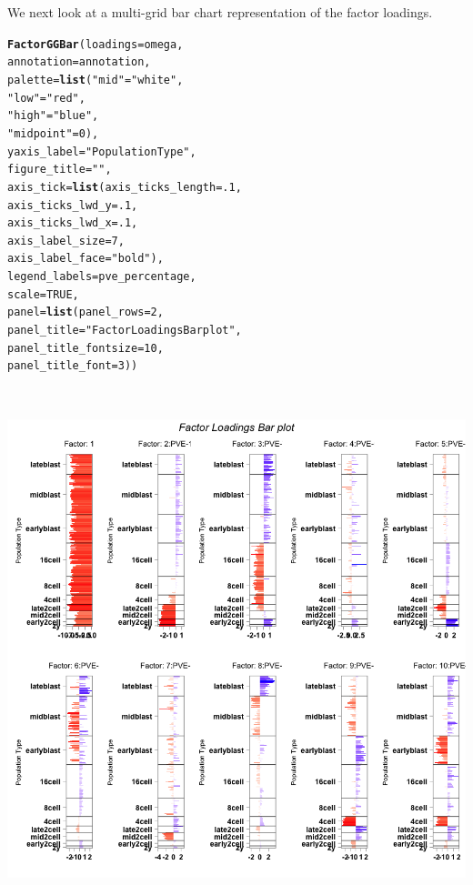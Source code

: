 \documentclass[12pt]{article}\usepackage[]{graphicx}\usepackage[usenames,dvipsnames]{color}
\makeatletter
\newcommand{\hlnum}[1]{\textcolor[rgb]{0.686,0.059,0.569}{#1}}%
\newcommand{\hlstr}[1]{\textcolor[rgb]{0.192,0.494,0.8}{#1}}%
\newcommand{\hlstd}[1]{\textcolor[rgb]{0.345,0.345,0.345}{#1}}%
\newcommand{\hlkwc}[1]{\textcolor[rgb]{0.333,0.667,0.333}{#1}}%
\newcommand{\hlkwd}[1]{\textcolor[rgb]{0.737,0.353,0.396}{\textbf{#1}}}%
\newenvironment{kframe}{%
 \def\at@end@of@kframe{}%
 \ifinner\ifhmode%
  \def\at@end@of@kframe{\end{minipage}}%
  \begin{minipage}{\columnwidth}%
 \fi\fi%
 \def\FrameCommand##1{\hskip\@totalleftmargin \hskip-\fboxsep
 \colorbox{shadecolor}{##1}\hskip-\fboxsep
     \hskip-\linewidth \hskip-\@totalleftmargin \hskip\columnwidth}%
 \MakeFramed {\advance\hsize-\width
   \@totalleftmargin\z@ \linewidth\hsize
   \@setminipage}}%
 {\par\unskip\endMakeFramed%
 \at@end@of@kframe}
\newenvironment{knitrout}{}{} %
\makeatother
\begin{document}
We next look at a multi-grid bar chart representation of the factor loadings.

\begin{knitrout}
\color{fgcolor}\begin{kframe}
\begin{alltt}
\hlkwd{FactorGGBar}\hlstd{(}\hlkwc{loadings} \hlstd{= omega,}
            \hlkwc{annotation} \hlstd{= annotation,}
            \hlkwc{palette} \hlstd{=} \hlkwd{list}\hlstd{(}\hlstr{"mid"}\hlstd{=}\hlstr{"white"}\hlstd{,}
                           \hlstr{"low"}\hlstd{=}\hlstr{"red"}\hlstd{,}
                           \hlstr{"high"}\hlstd{=}\hlstr{"blue"}\hlstd{,}
                           \hlstr{"midpoint"}\hlstd{=}\hlnum{0}\hlstd{),}
            \hlkwc{yaxis_label} \hlstd{=} \hlstr{"Population Type"}\hlstd{,}
            \hlkwc{figure_title} \hlstd{=} \hlstr{" "}\hlstd{,}
            \hlkwc{axis_tick} \hlstd{=} \hlkwd{list}\hlstd{(}\hlkwc{axis_ticks_length} \hlstd{=} \hlnum{.1}\hlstd{,}
                             \hlkwc{axis_ticks_lwd_y} \hlstd{=} \hlnum{.1}\hlstd{,}
                             \hlkwc{axis_ticks_lwd_x} \hlstd{=} \hlnum{.1}\hlstd{,}
                             \hlkwc{axis_label_size} \hlstd{=} \hlnum{7}\hlstd{,}
                             \hlkwc{axis_label_face} \hlstd{=} \hlstr{"bold"}\hlstd{),}
            \hlkwc{legend_labels}\hlstd{=pve_percentage,}
            \hlkwc{scale}\hlstd{=}\hlnum{TRUE}\hlstd{,}
            \hlkwc{panel}\hlstd{=}\hlkwd{list}\hlstd{(}\hlkwc{panel_rows}\hlstd{=}\hlnum{2}\hlstd{,}
                       \hlkwc{panel_title}\hlstd{=}\hlstr{"Factor Loadings Bar plot"}\hlstd{,}
                       \hlkwc{panel_title_fontsize}\hlstd{=}\hlnum{10}\hlstd{,}
                       \hlkwc{panel_title_font}\hlstd{=}\hlnum{3}\hlstd{))}
\end{alltt}
\end{kframe}
\includegraphics[width=6in,height=6in]{figure/flash_multipanel_grid-1}

\end{knitrout}
\end{document}
